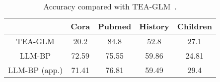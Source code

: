 \begin{table}[h]
\centering
\begin{tabular}{ccccc}
\hline
 & Cora & Pubmed & History & Children \\ \hline
TEA-GLM & 20.2 & 84.8 & 52.8 & 27.1 \\ \hline
LLM-BP & 72.59 & 75.55 & 59.86 & 24.81 \\
LLM-BP (app.) & 71.41 & 76.81 & 59.49 & 29.4 \\ \hline
\end{tabular}
\caption{Accuracy compared with TEA-GLM~\cite{wang2024llms}.}
\label{tab:compare_tea-glm}
\end{table}